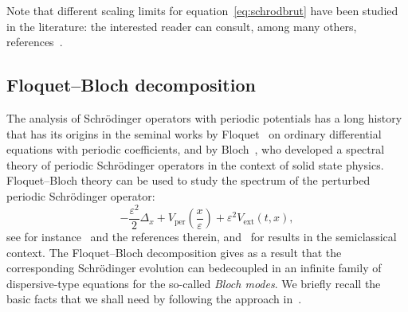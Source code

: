 \documentclass[AHL,Unicode,longabstracts]{cedram}
\DeclareMathOperator{\ext}{ext}
\DeclareMathOperator{\per}{per}
\newcommand*\eps{\varepsilon}
\numberwithin{equation}{section}
\begin{document}

Note that different scaling limits for equation~\eqref{eq:schrodbrut} have been studied in the literature: the interested reader can consult, among many others, references~\cite{AP06,BMP01,CS12,DGR06,Ge91,GMMP,HST:01,PR96, PST:03}.



\subsection{Floquet--Bloch decomposition}\label{sec:FB}

The analysis of Schr\"odinger operators with periodic potentials has a long history that has its origins in the seminal works by Floquet~\cite{Floquet1883} on ordinary differential equations with periodic coefficients, and by Bloch~\cite{Bloch28}, who developed a spectral theory of periodic Schr\"odinger operators in the context of solid state physics. Floquet--Bloch theory can be used to study the spectrum of the perturbed periodic Schr\"odinger operator:
\[
-\frac{\eps^2}{2}\Delta_x+V_{\per}\left(\frac{x}{\eps}\right)+\eps^2V_{\ext}(t,x),
\]
see for instance~\cite{Kuch01,Kuch04,Kuch16,RS:V4} and the references therein, and~\cite{GMS91,HW11,Out:87} for results in the semiclassical context. The Floquet--Bloch decomposition gives as a result that the corresponding Schr\"odinger evolution can be\linebreak decoupled in an infinite family of dispersive-type equations for the so-called \emph{Bloch modes}. We briefly recall the basic facts that we shall need by following the approach in~\cite{Ge91,GMS91}.

\end{document}
